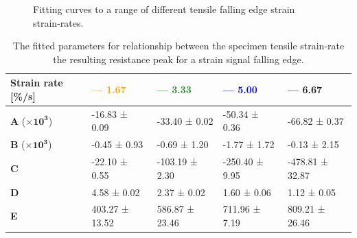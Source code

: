 \begin{figure}[H]
\begin{minipage}[t]{.49\textwidth}
		\vfill
	\end{minipage}
	\caption{Fitting curves to a range of different tensile falling edge strain strain-rates.}
	\label{fig:poly2_strain_relation}
\end{figure}
\begin{table}[H]
	\centering
	\caption{The fitted parameters for relationship between the specimen tensile strain-rate the resulting resistance peak for a strain signal falling edge.}
	\label{tab:}
	\begin{tabular}{lllll}
		\hline
		\textbf{Strain rate [\%/s]} & \textcolor{orange}{\textbf{--- 1.67}} & \textcolor{ForestGreen}{\textbf{--- 3.33}} & \textcolor{blue}{\textbf{--- 5.00}} & \textcolor{Rhodamine}{\textbf{--- 6.67}} \\ \hline
		\textbf{A} ($\mathbf{\times 10^3}$) & -16.83 ± 0.09 & -33.40 ± 0.02 & -50.34 ± 0.36 & -66.82 ± 0.37 \\ \hline
		\textbf{B} ($\mathbf{\times 10^3}$) & -0.45 ± 0.93 & -0.69 ± 1.20 & -1.77 ± 1.72 & -0.13 ± 2.15 \\ \hline
		\textbf{C} & -22.10 ± 0.55 & -103.19 ± 2.30 & -250.40 ± 9.95 & -478.81 ± 32.87 \\ \hline
		\textbf{D} & 4.58 ± 0.02 & 2.37 ± 0.02 & 1.60 ± 0.06 & 1.12 ± 0.05 \\ \hline
		\textbf{E} & 403.27 ± 13.52 & 586.87 ± 23.46 & 711.96 ± 7.19 & 809.21 ± 26.46 \\ \hline
	\end{tabular}
\end{table}


